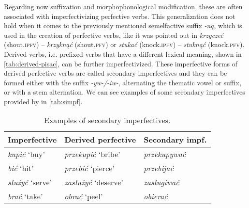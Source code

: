 \documentclass[12pt]{article}
\begin{document}
Regarding now suffixation and morphophonological modification, these are often associated with imperfectivizing perfective verbs. This generalization does not hold when it comes to the previously mentioned semelfactive suffix \textit{-ną}, which is used in the creation of perfective verbs, like it was pointed out in \textit{krzyczeć} (shout.\textsc{ipfv}) -- \textit{krzyknąć} (shout.\textsc{pfv}) or \textit{stukać} (knock.\textsc{ipfv}) -- \textit{stuknąć} (knock.\textsc{pfv}). Derived verbs, i.e. prefixed verbs that have a different lexical meaning, shown in \autoref{tab:derived-pisac}, can be further imperfectivized. These imperfective forms of derived perfective verbs are called secondary imperfectives and they can be formed either with the suffix \textit{-yw-/-i\textit{w}-}, alternating the thematic vowel or suffix, or with a stem alternation. We can see examples of some secondary imperfectives provided by \textcite{willim2006EventIndividuationCountability} in \autoref{tab:simpf}.


 \begin{table}[h!]
    \centering
    \small
    \begin{tabular}{p{2.5cm}p{3cm}l}
        \toprule
        \textbf{Imperfective} & \textbf{Derived perfective} & \textbf{Secondary impf.} \\ 
        \midrule
        \textit{kupić} `buy' & \textit{przekupić} `bribe'	& \textit{przekupywać}  \\
        \textit{bić} `hit' & \textit{przebić} `pierce'	& \textit{przebijać} 	 \\
        \textit{służyć} `serve' & \textit{zasłużyć} `deserve'  & \textit{zasługiwać}	 \\
        \textit{brać} `take' & \textit{obrać}	`peel' & \textit{obierać}  \\
        \bottomrule
    \end{tabular}
    \caption{Examples of secondary imperfectives.}
    \label{tab:simpf}
\end{table}
\end{document}
